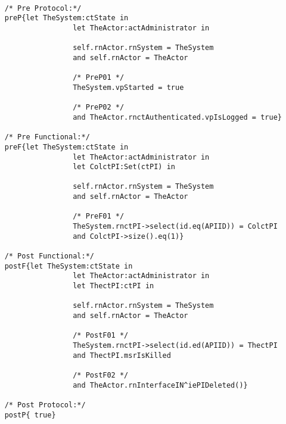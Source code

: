 	\scriptsize
	\vspace{0.5cm}
	\begin{lstlisting}[style=MessirStyle,firstnumber=auto,captionpos=b,caption={\msrmessir (MCL-oriented) specification of the operation \emph{oeDeletePI}.},label=OM-actAdministrator-oeDeletePI-MCL-LST]

	/* Pre Protocol:*/ 
	preP{let TheSystem:ctState in
					let TheActor:actAdministrator in
					
					self.rnActor.rnSystem = TheSystem
					and self.rnActor = TheActor
					
					/* PreP01 */
					TheSystem.vpStarted = true
					
					/* PreP02 */
					and TheActor.rnctAuthenticated.vpIsLogged = true}
	
	/* Pre Functional:*/
	preF{let TheSystem:ctState in
					let TheActor:actAdministrator in
					let ColctPI:Set(ctPI) in
					
					self.rnActor.rnSystem = TheSystem
					and self.rnActor = TheActor
					
					/* PreF01 */
					TheSystem.rnctPI->select(id.eq(APIID)) = ColctPI
					and ColctPI->size().eq(1)}
	
	/* Post Functional:*/ 
	postF{let TheSystem:ctState in
					let TheActor:actAdministrator in
					let ThectPI:ctPI in
					
					self.rnActor.rnSystem = TheSystem
					and self.rnActor = TheActor
					
					/* PostF01 */
					TheSystem.rnctPI->select(id.ed(APIID)) = ThectPI
					and ThectPI.msrIsKilled
					
					/* PostF02 */
					and TheActor.rnInterfaceIN^iePIDeleted()}
	
	/* Post Protocol:*/ 
	postP{ true}
	
	\end{lstlisting}
	\normalsize 
	
	
	
	





